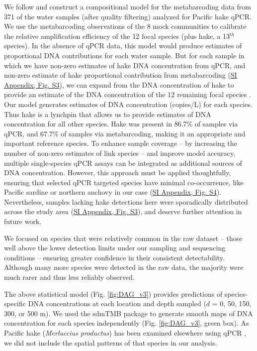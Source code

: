 \documentclass{article}
\begin{document}
We follow \cite{shelton2023} and construct a compositional model for the metabarcoding data from 371 of the water samples (after quality filtering) analyzed for Pacific hake qPCR. We use the metabarcoding observations of the 8 mock communities to calibrate the relative amplification efficiency of the 12 focal species (plus hake, a 13$^{th}$ species). In the absence of qPCR data, this model would produce estimates of proportional DNA contributions for each water sample. But for each sample in which we have non-zero estimates of hake DNA concentration from qPCR, and non-zero estimate of hake proportional contribution from metabarcoding (\href{SI_Appendix.pdf}{SI Appendix, Fig. S3}), we can expand from the DNA concentration of hake to provide an estimate of the DNA concentration of the 12 remaining focal species \cite{allan2023}. Our model generates estimates of DNA concentration (copies/L) for each species. Thus hake is a lynchpin that allows us to provide estimates of DNA concentration for all other species. Hake was present in 86.7\% of samples via qPCR, and 67.7\% of samples via metabarcoding, making it an appropriate and important reference species. To enhance sample coverage -- by increasing the number of non-zero estimates of link species -- and improve model accuracy, multiple single-species qPCR assays can be integrated as additional sources of DNA concentration. However, this approach must be applied thoughtfully, ensuring that selected qPCR targeted species have minimal co-occurrence, like Pacific sardine or northern anchovy in our case (\href{SI_Appendix.pdf}{SI Appendix, Fig. S4}). Nevertheless, samples lacking hake detections here were sporadically distributed across the study area (\href{SI_Appendix.pdf}{SI Appendix, Fig. S3}), and deserve further attention in future work.

We focused on species that were relatively common in the raw dataset – those well above the lower detection limits under our sampling and sequencing conditions – ensuring greater confidence in their consistent detectability. Although many more species were detected in the raw data, the majority were much rarer and thus less reliably observed.

The above statistical model (Fig. \ref{fig:DAG_v3}) provides predictions of species-specific DNA concentrations at each location and depth sampled ($d$ = 0, 50, 150, 300, or 500 m). We used the sdmTMB package \cite{anderson2022} to generate smooth maps of DNA concentration for each species independently (Fig. \ref{fig:DAG_v3}, green box). As Pacific hake (\textit{Merluccius productus}) has been examined elsewhere using qPCR \cite{shelton2022}, we did not include the spatial patterns of that species in our analysis. 
\end{document}
